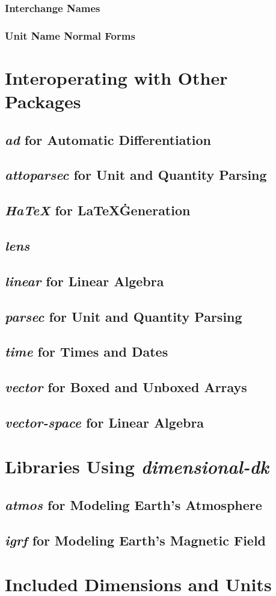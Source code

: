 \documentclass[12pt]{report}
\newcommand{\packagename}[1]{\textit{#1}}
\begin{document}
\subsection{Interchange Names}
\subsection{Unit Name Normal Forms}

\chapter{Interoperating with Other Packages}

\section{\packagename{ad} for Automatic Differentiation}
\section{\packagename{attoparsec} for Unit and Quantity Parsing}
\section{\packagename{HaTeX} for \LaTeX{}\. Generation}
\section{\packagename{lens}}
\section{\packagename{linear} for Linear Algebra}
\section{\packagename{parsec} for Unit and Quantity Parsing}
\section{\packagename{time} for Times and Dates}
\section{\packagename{vector} for Boxed and Unboxed Arrays}
\section{\packagename{vector-space} for Linear Algebra}

\chapter{Libraries Using \packagename{dimensional-dk}}

\section{\packagename{atmos} for Modeling Earth's Atmosphere}
\section{\packagename{igrf} for Modeling Earth's Magnetic Field}

\chapter{Included Dimensions and Units}
\end{document}
